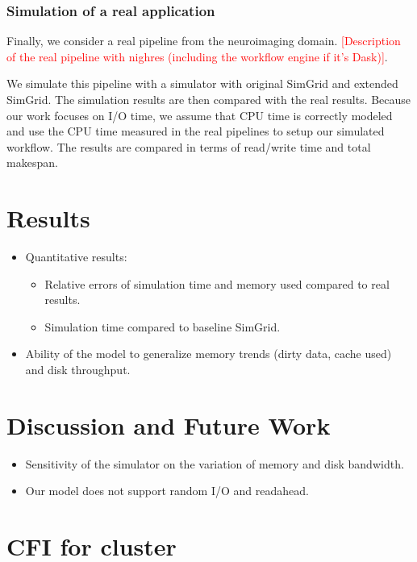 \documentclass[conference]{IEEEtran}
\begin{document}
		    \subsubsection{Simulation of a real application}

		    Finally, we consider a real pipeline from the neuroimaging domain. 			
			\textcolor{red}{[Description of the real pipeline with nighres 
			(including the workflow engine if it's Dask)]}.  			
			
			We simulate this pipeline with a simulator with original SimGrid and 
			extended SimGrid. 
			The simulation results are then compared with the real results. 
			Because our work focuses on I/O time, we assume that CPU time is 
			correctly modeled and use the CPU time measured in the real pipelines 
			to setup our simulated workflow. The results are compared in terms of 
			read/write time and total makespan.

	\section{Results}
	
		\begin{itemize}

			\item Quantitative results: 
				\begin{itemize}
					\item Relative errors of simulation time and memory used compared to real results.
					\item Simulation time compared to baseline SimGrid.
				\end{itemize} 

			\item Ability of the model to generalize memory trends (dirty data, cache used) and disk throughput.

		\end{itemize}

	\section{Discussion and Future Work}
		\begin{itemize}
			\item Sensitivity of the simulator on the variation of memory and disk bandwidth. 
			\item Our model does not support random I/O and readahead.
		\end{itemize}
	\section{CFI for cluster}


\end{document}
